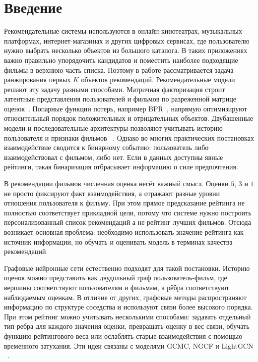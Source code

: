 \documentclass[12pt,fleqn]{article}
\begin{document}
\newpage
\renewcommand{\contentsname}{Содержание}
\tableofcontents


\newpage
\section{Введение}
\label{sec:introduction}

Рекомендательные системы используются в онлайн-кинотеатрах, музыкальных
платформах, интернет-магазинах и других цифровых сервисах, где пользователю
нужно выбрать несколько объектов из большого каталога. В таких приложениях
важно правильно упорядочить
кандидатов и поместить наиболее подходящие фильмы в верхнюю часть списка.
Поэтому в работе рассматривается задача ранжирования первых $K$ объектов рекомендаций.
Рекомендательные модели решают эту задачу разными способами.
Матричная факторизация строит латентные представления пользователей и фильмов
по разреженной матрице оценок~\cite{koren2009matrix}. Попарные функции потерь,
например BPR~\cite{rendle2009bpr}, напрямую оптимизируют относительный порядок
положительных и отрицательных объектов. Двубашенные модели и последовательные
архитектуры позволяют учитывать историю пользователя и признаки фильмов
~\cite{covington2016youtube,kang2018sasrec}. Однако во многих практических
постановках взаимодействие сводится к бинарному событию: пользователь либо
взаимодействовал с фильмом, либо нет. Если в данных доступны явные рейтинги,
такая бинаризация отбрасывает информацию о силе предпочтения.

В рекомендации фильмов численная оценка несёт важный смысл. Оценки $5$, $3$ и
$1$ не просто фиксируют факт взаимодействия, а отражают разные уровни отношения
пользователя к фильму. При этом прямое предсказание рейтинга не полностью
соответствует прикладной цели, потому что системе нужно построить персонализованный список рекомендаций а не рейтинг лучших фильмов. Отсюда возникает основная проблема: необходимо
использовать значение рейтинга как источник информации, но обучать и оценивать
модель в терминах качества рекомендаций.

Графовые нейронные сети естественно подходят для такой постановки. Историю
оценок можно представить как двудольный граф пользователь-фильм, где вершины
соответствуют пользователям и фильмам, а рёбра соответствуют наблюдаемым
оценкам. В отличие от других, графовые методы распространяют информацию по структуре
соседства и используют связи более высокого порядка. При этом рейтинг можно
учитывать несколькими способами: задавать отдельный тип ребра для каждого
значения оценки, превращать оценку в вес связи, обучать функцию рейтингового
веса или ослаблять старые взаимодействия с помощью временного затухания. Эти
идеи связаны с моделями GCMC, NGCF и LightGCN
~\cite{vandenberg2017gcmc,wang2019ngcf,he2020lightgcn}.
\end{document}

